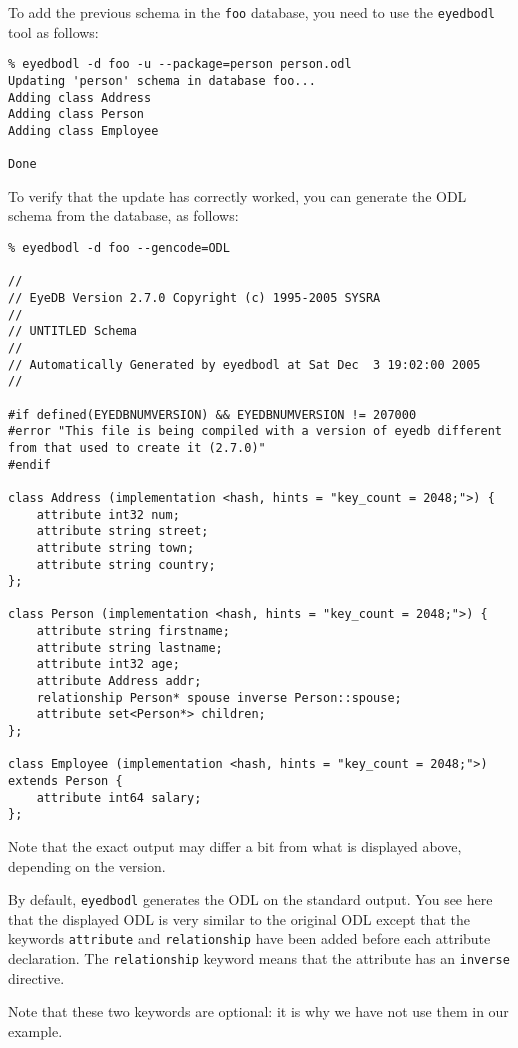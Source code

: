 To add the previous schema in the \texttt{foo} database, you need to
use the \texttt{eyedbodl} tool as follows:
\verbsize \begin{verbatim}
% eyedbodl -d foo -u --package=person person.odl
Updating 'person' schema in database foo...
Adding class Address
Adding class Person
Adding class Employee

Done
\end{verbatim}
\normalsize
To verify that the update has correctly worked, you can generate
the ODL schema from the database, as follows:
\verbsize \begin{verbatim}
% eyedbodl -d foo --gencode=ODL

//
// EyeDB Version 2.7.0 Copyright (c) 1995-2005 SYSRA
//
// UNTITLED Schema
//
// Automatically Generated by eyedbodl at Sat Dec  3 19:02:00 2005
//

#if defined(EYEDBNUMVERSION) && EYEDBNUMVERSION != 207000
#error "This file is being compiled with a version of eyedb different from that used to create it (2.7.0)"
#endif

class Address (implementation <hash, hints = "key_count = 2048;">) {
	attribute int32 num;
	attribute string street;
	attribute string town;
	attribute string country;
};

class Person (implementation <hash, hints = "key_count = 2048;">) {
	attribute string firstname;
	attribute string lastname;
	attribute int32 age;
	attribute Address addr;
	relationship Person* spouse inverse Person::spouse;
	attribute set<Person*> children;
};

class Employee (implementation <hash, hints = "key_count = 2048;">) extends Person {
	attribute int64 salary;
};
\end{verbatim}
\normalsize

Note that the exact output may differ a bit from what is displayed above, depending on the \eyedb version.

By default, \texttt{eyedbodl} generates the ODL on the standard output.
You see here that the displayed ODL is very similar to the original ODL except
that the keywords \texttt{attribute} and \texttt{relationship} have been added
before each attribute declaration.
The \texttt{relationship} keyword means that the attribute has an \texttt{inverse}
directive.

Note that these two keywords are optional: it is why we have not use
them in our example.


